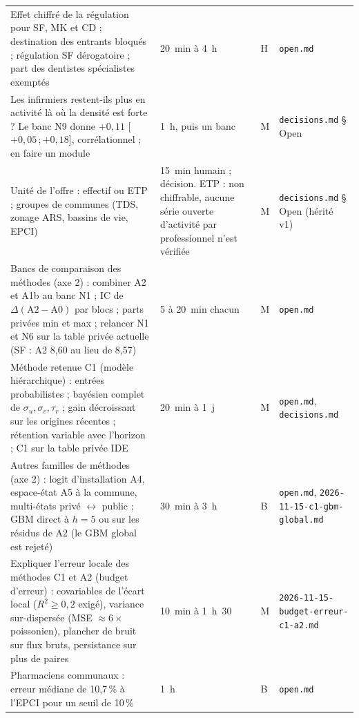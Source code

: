 \begin{small}
\begin{longtable}{@{}p{}p{}p{}p{}@{}}
Effet chiffré de la régulation pour SF, MK et CD ; destination des entrants bloqués ; régulation SF dérogatoire ; part des dentistes spécialistes exemptés & 20\suppose{}~min à 4\suppose{}~h & H & \texttt{open.md} \\
Les infirmiers restent-ils plus en activité là où la densité est forte ? Le banc N9 donne $+0{,}11$\mesure{} [$+0{,}05$\,;\,$+0{,}18$], corrélationnel ; en faire un module & 1\suppose{}~h, puis un banc & M & \texttt{decisions.md} § Open \\
Unité de l'offre : effectif ou ETP ; groupes de communes (TDS, zonage ARS, bassins de vie, EPCI) & 15\suppose{}~min humain ; décision. ETP : non chiffrable, aucune série ouverte d'activité par professionnel n'est vérifiée & M & \texttt{decisions.md} § Open (hérité v1) \\
Bancs de comparaison des méthodes (axe 2) : combiner A2 et A1b au banc N1 ; IC de $\Delta(\mathrm{A2}-\mathrm{A0})$ par blocs ; parts privées min et max ; relancer N1 et N6 sur la table privée actuelle (SF : A2 8,60 au lieu de 8,57\mesure{}) & 5 à 20\suppose{}~min chacun & M & \texttt{open.md} \\
Méthode retenue C1 (modèle hiérarchique) : entrées probabilistes ; bayésien complet de $\sigma_u,\sigma_v,\tau_r$ ; gain décroissant sur les origines récentes ; rétention variable avec l'horizon ; C1 sur la table privée IDE & 20\suppose{}~min à 1\suppose{}~j & M & \texttt{open.md}, \texttt{decisions.md} \\
Autres familles de méthodes (axe 2) : logit d'installation A4, espace-état A5 à la commune, multi-états privé $\leftrightarrow$ public ; GBM direct à $h=5$ ou sur les résidus de A2 (le GBM global est rejeté) & 30\suppose{}~min à 3\suppose{}~h & B & \texttt{open.md}, \texttt{2026-\allowbreak{}11-\allowbreak{}15-\allowbreak{}c1-\allowbreak{}gbm-\allowbreak{}global.md} \\
Expliquer l'erreur locale des méthodes C1 et A2 (budget d'erreur) : covariables de l'écart local ($R^2\geq0{,}2$\suppose{} exigé), variance sur-dispersée (MSE $\approx6\times$\mesure{} poissonien), plancher de bruit sur flux bruts, persistance sur plus de paires & 10\suppose{}~min à 1\suppose{}~h~30 & M & \texttt{2026-\allowbreak{}11-\allowbreak{}15-\allowbreak{}budget-\allowbreak{}erreur-\allowbreak{}c1-\allowbreak{}a2.md} \\
Pharmaciens communaux : erreur médiane de 10,7\mesure{}\,\% à l'EPCI pour un seuil de 10\suppose{}\,\% & 1\suppose{}~h & B & \texttt{open.md} \\

\end{longtable}
\end{small}
